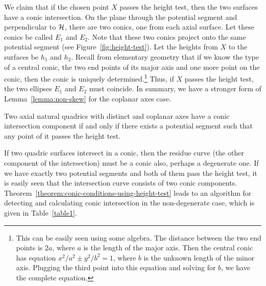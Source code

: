      We claim that if the chosen point $X$ passes the height test, then the two
surfaces have a conic intersection.   On the plane through the potential 
segment and perpendicular to ${\cal H}$, there are two conics, one from each 
axial surface.  Let these conics be called $E_1$ and $E_2$.  Note that these 
two conics project onto the same potential segment (see 
Figure~\ref{fig:height-test}).  Let the heights from $X$ to the surfaces be 
$h_1$ and $h_2$.  Recall from elementary geometry that if we know the type of a
central conic, the two end points of its major axis and one more point on the 
conic, then the conic is uniquely determined.\footnote{This can be easily seen
using some algebra.  The distance between the two end points is $2a$, where $a$
is the length of the major axis.  Then the central conic has equation 
$x^2/a^2\pm y^2/b^2=1$, where $b$ is the unknown length of the minor axis.  
Plugging the third point into this equation and solving for $b$, we have the 
complete equation.}  Thus, if $X$ passes the height test, the two ellipses 
$E_1$ and $E_2$ must coincide.  In summary, we have a stronger form of
Lemma~\ref{lemma:non-skew} for the coplanar axes case.

\begin{theorem}
\label{theorem:conic-conditions-using-height-test}
     Two axial natural quadrics with distinct and coplanar axes have a conic 
intersection component if and only if there exists a potential segment such 
that any point of it passes the height test.
\end{theorem}

     If two quadric surfaces intersect in a conic, then the residue curve (the
other component of the intersection) must be a conic also, perhaps a 
degenerate one.  If we have exactly two potential segments and both of them 
pass the height test, it is easily seen that the intersection curve consists 
of two conic components.  
Theorem~\ref{theorem:conic-conditions-using-height-test} leads to an algorithm
for detecting and calculating conic intersection in the non-degenerate case, 
which is given in Table~\ref{table1}.

